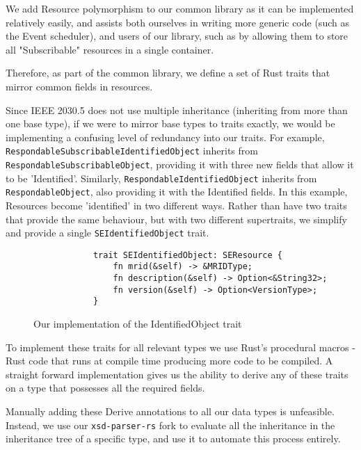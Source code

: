 We add Resource polymorphism to our common library as it can be implemented relatively easily, and assists both ourselves in writing more generic code (such as the Event scheduler), and users of our library, such as by allowing them to store all "Subscribable" resources in a single container.

Therefore, as part of the common library, we define a set of Rust traits that mirror common fields in resources. 

Since IEEE 2030.5 does not use multiple inheritance (inheriting from more than one base type), if we were to mirror base types to traits exactly, we would be implementing a confusing level of redundancy into our traits.
For example, \texttt{RespondableSubscribableIdentifiedObject} inherits from \texttt{RespondableSubscribableObject}, providing it with three new fields that allow it to be 'Identified'. Similarly, \texttt{RespondableIdentifiedObject} inherits from \texttt{RespondableObject}, also providing it with the Identified fields. In this example, Resources become 'identified' in two different ways. Rather than have two traits that provide the same behaviour, but with two different supertraits, we simplify and provide a single \texttt{SEIdentifiedObject} trait. 

\begin{figure}[H]
    \begin{center}
        \begin{lstlisting}
            trait SEIdentifiedObject: SEResource {
                fn mrid(&self) -> &MRIDType;
                fn description(&self) -> Option<&String32>;
                fn version(&self) -> Option<VersionType>;
            }
        \end{lstlisting}
        \label{fig:identtrait}
        \caption{Our implementation of the IdentifiedObject trait}
    \end{center}
\end{figure}

To implement these traits for all relevant types we use Rust's procedural macros - Rust code that runs at compile time producing more code to be compiled. A straight forward implementation gives us the ability to derive any of these traits on a type that possesses all the required fields.

Manually adding these Derive annotations to all our data types is unfeasible. Instead, we use our \texttt{xsd-parser-rs} fork to evaluate all the inheritance in the inheritance tree of a specific type, and use it to automate this process entirely. 

